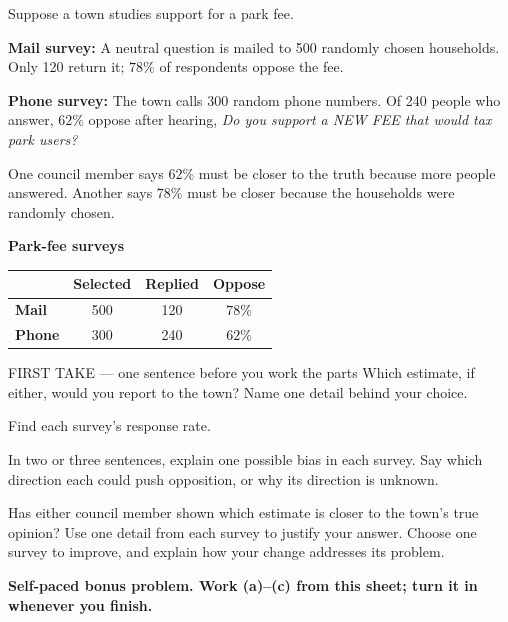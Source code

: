 \documentclass[14pt]{extarticle}
\begin{document}
\pagestyle{empty}


\noindent\begin{minipage}[t]{0.57\linewidth}
\vspace{0pt}
Suppose a town studies support for a park fee.\par\smallskip \textbf{Mail survey:} A neutral question is mailed to 500 randomly chosen households. Only 120 return it; $78\%$ of respondents oppose the fee.\par \textbf{Phone survey:} The town calls 300 random phone numbers. Of 240 people who answer, $62\%$ oppose after hearing, \emph{Do you support a NEW FEE that would tax park users?}\par\smallskip One council member says $62\%$ must be closer to the truth because more people answered. Another says $78\%$ must be closer because the households were randomly chosen.\par
\end{minipage}\hfill
\begin{minipage}[t]{0.40\linewidth}
\vspace{0pt}
\begin{center}
\textbf{Park-fee surveys}\par\smallskip
\begin{tabular}{|l|c|c|c|}
\hline
\textbf{} & \textbf{Selected} & \textbf{Replied} & \textbf{Oppose} \\ \hline
\textbf{Mail} & 500 & 120 & $78\%$ \\ \hline
\textbf{Phone} & 300 & 240 & $62\%$ \\ \hline
\end{tabular}
\end{center}
\end{minipage}

\begin{firsttakebox}{FIRST TAKE --- one sentence before you work the parts}
Which estimate, if either, would you report to the town? Name one detail behind your choice.
\end{firsttakebox}

\begin{description}[leftmargin=1.15in, labelwidth=1in, itemsep=2pt, topsep=2pt]
  \item[\dokbadge{1}~(a)] Find each survey's response rate.
  \item[\dokbadge{2}~(b)] In two or three sentences, explain one possible bias in each survey. Say which direction each could push opposition, or why its direction is unknown.
  \item[\dokbadge{3}~(c)] Has either council member shown which estimate is closer to the town's true opinion? Use one detail from each survey to justify your answer. Choose one survey to improve, and explain how your change addresses its problem.
\end{description}

\vfill
\textbf{Self-paced bonus problem. Work (a)--(c) from this sheet; turn it in whenever you finish.}
\end{document}
